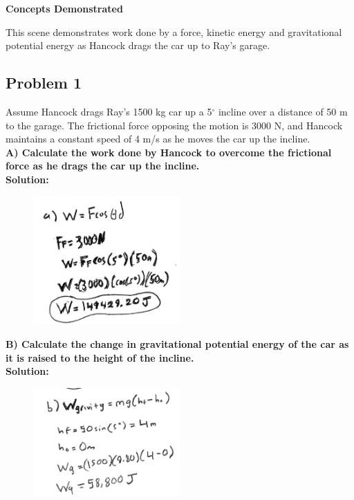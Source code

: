 \documentclass[a4paper,12pt]{article}
\begin{document}
\vspace{0.3cm}
\noindent\textbf{Concepts Demonstrated} \par
This scene demonstrates work done by a force, kinetic energy and gravitational potential energy as Hancock drags the car up to Ray's garage.  

\subsection{Problem 1}
Assume Hancock drags Ray's 1500 kg car up a 5$^\circ$ incline over a distance of 50 m to the garage. The frictional force opposing the motion is 3000 N, and Hancock maintains a constant speed of 4 m/s as he moves the car up the incline. \\


\noindent\textbf{A) Calculate the work done by Hancock to overcome the frictional force as he drags the car up the incline.} \\

\noindent\textbf{Solution:}

\begin{figure}[H]
    \centering
    \includegraphics[width=0.5\textwidth]{U3_P1_A} %
\end{figure} 

\newpage

\noindent\textbf{B) Calculate the change in gravitational potential energy of the car as it is raised to the height of the incline.} \\

\noindent\textbf{Solution:}

\begin{figure}[H]
    \centering
    \includegraphics[width=0.5\textwidth]{U3_P1_B} %
\end{figure}
\end{document}
